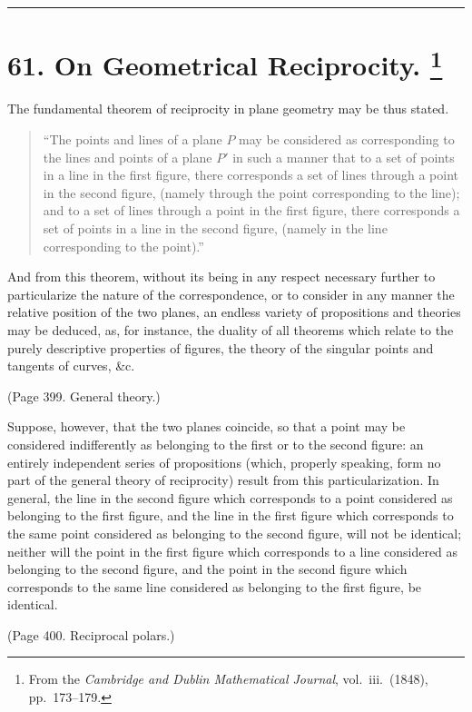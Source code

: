 \documentclass[11pt,a4paper]{article}
\theoremstyle{plain}
\theoremstyle{definition}
\begin{document}
\bigskip
\hrule
\bigskip


\newpage
\section[On Geometrical Reciprocity]{%
61. On Geometrical Reciprocity.%
\footnote{From the \textit{Cambridge and Dublin Mathematical Journal}, vol.~iii.\ (1848), pp.~173--179.}}

The fundamental theorem of reciprocity in plane geometry may be thus stated.
\begin{quote}
``The points and lines of a plane $P$ may be considered as corresponding to the
lines and points of a plane $P'$ in such a manner that to a set of points in a line
in the first figure, there corresponds a set of lines through a point in the second
figure, (namely through the point corresponding to the line); and to a set of lines
through a point in the first figure, there corresponds a set of points in a line in the
second figure, (namely in the line corresponding to the point).''
\end{quote}

And from this theorem, without its being in any respect necessary further to
particularize the nature of the correspondence, or to consider in any manner the relative
position of the two planes, an endless variety of propositions and theories may be
deduced, as, for instance, the duality of all theorems which relate to the purely
descriptive properties of figures, the theory of the singular points and tangents of
curves, \&c.

(Page 399. General theory.)

Suppose, however, that the two planes coincide, so that a point may be considered
indifferently as belonging to the first or to the second figure: an entirely independent
series of propositions (which, properly speaking, form no part of the general theory of
reciprocity) result from this particularization. In general, the line in the second figure
which corresponds to a point considered as belonging to the first figure, and the line
in the first figure which corresponds to the same point considered as belonging to
the second figure, will not be identical; neither will the point in the first figure
which corresponds to a line considered as belonging to the second figure, and the point
in the second figure which corresponds to the same line considered as belonging to
the first figure, be identical.

(Page 400. Reciprocal polars.)
\end{document}
